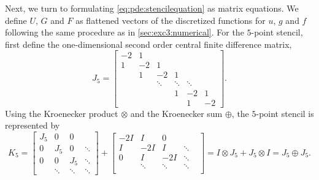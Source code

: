 Next, we turn to formulating \cref{eq:pde:stencilequation} as matrix equations.
We define $U$, $G$ and $F$ as flattened vectors of the discretized functions for $u$, $g$ and $f$ following the same procedure as in \cref{sec:exc3:numerical}.
For the $5$-point stencil, first define the one-dimensional second order central finite difference matrix,
$$
J_5 =
\begin{bmatrix}
  -2 & 1 &   \\
  1 & -2 & 1 &  \\
  & 1 & -2 & 1 & \\
  &&\ddots&\ddots&\ddots\\
  &&& 1 & -2 & 1\\
  &&&& 1 & -2
\end{bmatrix}
.
$$
Using the Kroenecker product $\otimes$ and the Kroenecker sum $\oplus$, the $5$-point stencil is represented by
$$
K_5 =
\begin{bmatrix}
  J_5 & 0 & 0 & \\
  0 & J_5 & 0 & \ddots \\
  0 & 0 & J_5 & \ddots \\
  &\ddots&\ddots&\ddots
\end{bmatrix}
+
\begin{bmatrix}
  -2I & I & 0 & \\
  I & -2I & I & \ddots \\
  0 & I & -2I & \ddots  \\
  & \ddots & \ddots & \ddots & \\
\end{bmatrix}
= I \otimes J_5
+ J_5 \otimes I 
= J_5 \oplus J_5
.
$$

